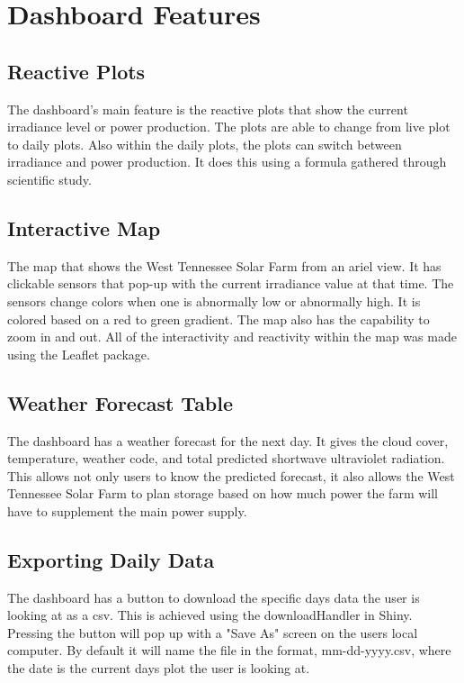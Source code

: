 \documentclass{sigchi}
\begin{document}
\section{Dashboard Features}

\subsection{Reactive Plots}
The dashboard's main feature is the reactive plots that show the current irradiance level or power production. The plots are able to change from live plot to daily plots. Also within the daily plots, the plots can switch between irradiance and power production. It does this using a formula gathered through scientific study.\cite{PowerConversion}

\subsection{Interactive Map}
The map that shows the West Tennessee Solar Farm\cite{WTSF} from an ariel view. It has clickable sensors that pop-up with the current irradiance value at that time. The sensors change colors when one is abnormally low or abnormally high. It is colored based on a red to green gradient. The map also has the capability to zoom in and out. All of the interactivity and reactivity within the map was made using the Leaflet package.\cite{Leaflet}

\subsection{Weather Forecast Table}
The dashboard has a weather forecast for the next day. It gives the cloud cover, temperature, weather code, and total predicted shortwave ultraviolet radiation. This allows not only users to know the predicted forecast, it also allows the West Tennessee Solar Farm to plan storage based on how much power the farm will have to supplement the main power supply.

\subsection{Exporting Daily Data}
The dashboard has a button to download the specific days data the user is looking at as a csv. This is achieved using the downloadHandler in Shiny.\cite{R-Shiny} Pressing the button will pop up with a "Save As" screen on the users local computer. By default it will name the file in the format, mm-dd-yyyy.csv, where the date is the current days plot the user is looking at.
\end{document}
